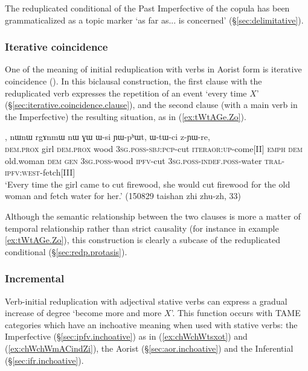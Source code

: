 The reduplicated conditional  of the Past Imperfective of the copula  has been grammaticalized as a topic marker  `as far as... is concerned' (§\ref{sec:delimitative}).


\subsubsection{Iterative coincidence} \label{sec:iterative.coincidence}
One of the meaning of initial reduplication with verbs in Aorist form is iterative coincidence (\citealt[295--296]{jacques14linking}). In this biclausal construction, the first clause with the reduplicated verb expresses the repetition of an event `every time $X$' (§\ref{sec:iterative.coincidence.clause}), and the second clause (with a main verb in the Imperfective) the resulting situation, as in (\ref{ex:tWtAGe.Zo}).

\begin{exe}
\ex \label{ex:tWtAGe.Zo}
, nɯnɯ rgɤnmɯ nɯ ɣɯ ɯ-si ɲɯ-pʰɯt, ɯ-tɯ-ci z-ɲɯ-re, \\
\textsc{dem}.\textsc{prox} girl \textsc{dem}.\textsc{prox} wood \textsc{3sg}.\textsc{poss}-\textsc{sbj}:\textsc{pcp}-cut \textsc{iter}\redp{}\textsc{aor}:\textsc{up}-come[II] \textsc{emph} \textsc{dem} old.woman \textsc{dem} \textsc{gen} \textsc{3sg}.\textsc{poss}-wood \textsc{ipfv}-cut \textsc{3sg}.\textsc{poss}-\textsc{indef}.\textsc{poss}-water \textsc{tral}-\textsc{ipfv}:\textsc{west}-fetch[III] \\
\glt `Every time the girl came to cut firewood, she would cut firewood for the old woman and fetch water for her.' (150829 taishan zhi zhu-zh, 33)
\end{exe}

Although the semantic relationship between the two clauses is more a matter of temporal relationship rather than strict causality (for instance in example \ref{ex:tWtAGe.Zo}), this construction is clearly a subcase of the reduplicated conditional (§\ref{sec:redp.protasis}).
 
\subsubsection{Incremental} \label{sec:redp.gradual.increase}
Verb-initial reduplication with adjectival stative verbs can express a gradual increase of degree `become more and more $X$'. This function occurs with TAME categories which have an inchoative meaning when used with stative verbs: the Imperfective (§\ref{sec:ipfv.inchoative}) as in (\ref{ex:chWchWtsxot}) and (\ref{ex:chWchWmACindZi}), the Aorist (§\ref{sec:aor.inchoative}) and the Inferential (§\ref{sec:ifr.inchoative}). 
 
